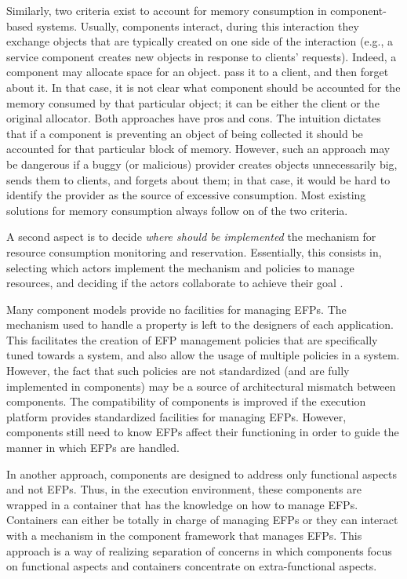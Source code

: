 Similarly, two criteria exist to account for memory consumption in component-based systems.
Usually, components interact, during this interaction they exchange objects that are typically created on one side of the interaction (e.g., a service component creates new objects in response to clients' requests).
Indeed, a component may allocate space for an object. pass it to a client, and then forget about it.
In that case, it is not clear what component should be accounted for the memory consumed by that particular object; it can be either the client or the original allocator.
Both approaches have pros and cons.
The intuition dictates that if a component is preventing an object of being collected it should be accounted for that particular block of memory.
However, such an approach may be dangerous if a buggy (or malicious) provider creates objects unnecessarily big, sends them to clients, and forgets about them; in that case, it would be hard to identify the provider as the source of excessive consumption. 
Most existing solutions for memory consumption always follow on of the two criteria.

A second aspect is to decide \textit{where should be implemented} the mechanism for resource consumption monitoring and reservation.
Essentially, this consists in, selecting which actors implement the mechanism and policies to manage resources, and deciding if the actors collaborate to achieve their goal \cite{Crnkovic2011}.

Many component models provide no facilities for managing EFPs.
The mechanism used to handle a property is left to the designers of each application.
This facilitates the creation of EFP management policies that are specifically tuned towards a system, and also allow the usage of multiple policies in a system.
However, the fact that such policies are not
standardized (and are fully implemented in components) may be a source of architectural mismatch between
components.
The compatibility of components is improved if the
execution platform provides standardized facilities for managing EFPs.
However, components still need to know EFPs affect their functioning in order to guide the manner
in which EFPs are handled.

In another approach, components are designed to address only functional aspects and not EFPs.
Thus, in the execution environment, these components
are wrapped in a container that has the knowledge on how to manage EFPs.
Containers can either be totally in charge of managing EFPs or
they can interact with a mechanism in the component framework that manages EFPs.
This approach is a way of realizing separation of
concerns in which components focus on functional aspects
and containers concentrate on extra-functional aspects.

